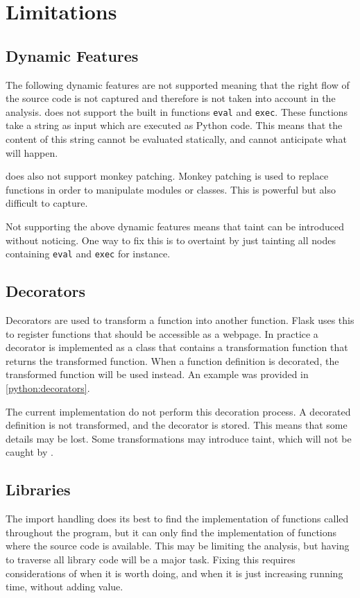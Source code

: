 \section{Limitations}
\subsection{Dynamic Features}
The following dynamic features are not supported meaning that the right flow of the source code is not captured and therefore is not taken into account in the analysis.
\pyt{} does not support the built in functions \texttt{eval} and \texttt{exec}.
These functions take a string as input which are executed as Python code.
This means that the content of this string cannot be evaluated statically, and \pyt{} cannot anticipate what will happen.

\pyt{} does also not support monkey patching.
Monkey patching is used to replace functions in order to manipulate modules or classes.
This is powerful but also difficult to capture.

Not supporting the above dynamic features means that taint can be introduced without \pyt{} noticing.
One way to fix this is to overtaint by just tainting all nodes containing \texttt{eval} and \texttt{exec} for instance.

\subsection{Decorators}
Decorators are used to transform a function into another function.
Flask uses this to register functions that should be accessible as a webpage.
In practice a decorator is implemented as a class that contains a transformation function that returns the transformed function.
When a function definition is decorated, the transformed function will be used instead.
An example was provided in \cref{python:decorators}.

The current implementation do not perform this decoration process.
A decorated definition is not transformed, and the decorator is stored.
This means that some details may be lost.
Some transformations may introduce taint, which will not be caught by \pyt{}.

\subsection{Libraries}
The import handling does its best to find the implementation of functions called throughout the program, but it can only find the implementation of functions where the source code is available.
This may be limiting the analysis, but having to traverse all library code will be a major task.
Fixing this requires considerations of when it is worth doing, and when it is just increasing running time, without adding value.

